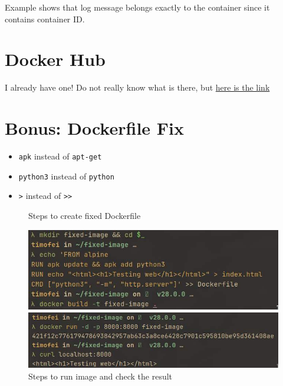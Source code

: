 \documentclass{article}
\newcommand{\code}[1]{\colorbox{light-gray}{\texttt{#1}}}
\begin{document}
Example shows that log message belongs exactly to the container since it contains container ID.

\section{Docker Hub}
\noindent

I already have one! Do not really know what is there, but \href{https://hub.docker.com/repository/docker/mashfeii/catnip/}{here is the link}


\newpage
\section{Bonus: Dockerfile Fix}
\noindent

\begin{itemize}
  \item \code{apk} instead of \code{apt-get}
  \item \code{python3} instead of \code{python}
  \item \code{>} instead of \code{>>}
\end{itemize}

\begin{figure}[h]
  \centering

  \caption{Steps to create fixed Dockerfile}
  \includegraphics[width=480pt]{dockerfix_image.jpg}

  \caption{Steps to run image and check the result}
  \includegraphics[width=480pt]{dockerfix_test.jpg}
\end{figure}
\end{document}
